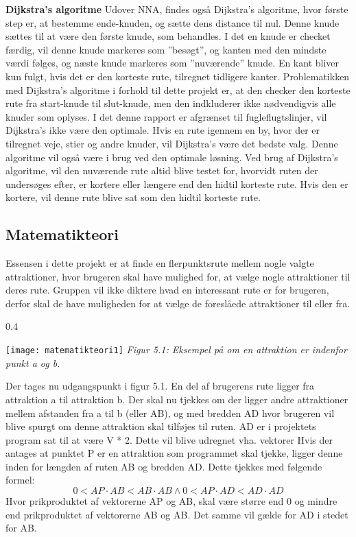 \textbf{Dijkstra's algoritme}\newline
Udover NNA, findes også Dijkstra’s algoritme, hvor første step er, at bestemme ende-knuden, og sætte dens distance til nul. Denne knude sættes til at være den første knude, som behandles. I det en knude er checket færdig, vil denne knude markeres som ”besøgt”, og kanten med den mindste værdi følges, og næste knude markeres som ”nuværende” knude. En kant bliver kun fulgt, hvis det er den korteste rute, tilregnet tidligere kanter.
Problematikken med Dijkstra’s algoritme i forhold til dette projekt er, at den checker den korteste rute fra start-knude til slut-knude, men den indkluderer ikke nødvendigvis alle knuder som oplyses. I det denne rapport er afgrænset til fugleflugtslinjer, vil Dijkstra’s ikke være den optimale. Hvis en rute igennem en by, hvor der er tilregnet veje, stier og andre knuder, vil Dijkstra’s være det bedste valg. Denne algoritme vil også være i brug ved den optimale løsning. Ved brug af Dijkstra’s algoritme, vil den nuværende rute altid blive testet for, hvorvidt ruten der undersøges efter, er kortere eller længere end den hidtil korteste rute. Hvis den er kortere, vil denne rute blive sat som den hidtil korteste rute.\citep{Dijkstra}

\subsection{Matematikteori}
Essensen i dette projekt er at finde en flerpunktsrute mellem nogle valgte attraktioner, hvor brugeren skal have mulighed for, at vælge nogle attraktioner til deres rute. Gruppen vil ikke diktere hvad en interessant rute er for brugeren, derfor skal de have muligheden for at vælge de foreslåede attraktioner til eller fra.

\begin{wrapfigure}{}{0.4\textwidth}
  \vspace{-10pt}
  \begin{center}
    \texttt{[image: matematikteori1]} \newline
    \textit{Figur 5.1: Eksempel på om en attraktion er indenfor punkt a og b.}\newline
  \end{center}
  \vspace{-20pt}
\end{wrapfigure}
 
Der tages nu udgangspunkt i figur 5.1. En del af brugerens rute ligger fra attraktion a til attraktion b. Der skal nu tjekkes om der ligger andre attraktioner mellem afstanden fra a til b (eller AB), og med bredden AD hvor brugeren vil blive spurgt om denne attraktion skal tilføjes til ruten. AD er i projektets program sat til at være V * 2. Dette vil blive udregnet vha. vektorer 
Hvis der antages at punktet P er en attraktion som programmet skal tjekke, ligger denne inden for længden af ruten AB og bredden AD. Dette tjekkes med følgende formel:
\[0 < AP \cdot AB < AB \cdot AB \wedge 0 < AP \cdot AD < AD \cdot AD \]
Hvor prikproduktet af vektorerne AP og AB, skal være større end 0 og mindre end prikproduktet af vektorerne AB og AB. Det samme vil gælde for AD i stedet for AB.

